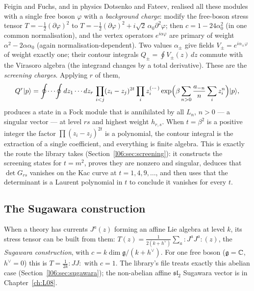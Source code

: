 Feigin and Fuchs, and in physics Dotsenko and Fateev, realised all these modules with a single free
boson $\varphi$ with a \emph{background charge}: modify the free-boson stress tensor
$T = -\frac12(\partial\varphi)^2$ to $T = -\frac12(\partial\varphi)^2 + i\sqrt2\,\alpha_0\partial^2\varphi$; then
$c = 1-24\alpha_0^2$ (in one common normalisation), and the vertex operators $e^{i\alpha\varphi}$ are
primary of weight $\alpha^2-2\alpha\alpha_0$ (again normalisation-dependent). Two values $\alpha_\pm$ give
fields $V_\pm = e^{i\alpha_\pm\varphi}$ of weight exactly one; their contour integrals
$Q_\pm = \oint V_\pm(z)\,dz$ commute with the Virasoro algebra (the integrand changes by a total
derivative). These are the \emph{screening charges}. Applying $r$ of them,
\begin{equation*}
 Q^r|p\rangle = \oint\!\cdots\!\oint dz_1\cdots dz_r\,\prod_{i<j}(z_i-z_j)^{2t}\prod_i z_i^{(\cdots)}
 \exp\Bigl(\beta\sum_{n>0}\frac{a_{-n}}{n}\sum_i z_i^n\Bigr)|p\rangle ,
\end{equation*}
produces a state in a Fock module that is annihilated by all $L_n$, $n>0$ --- a singular vector ---
at level $rs$ and highest weight $h_{r,s}$. When $t = \beta^2$ is a positive integer the factor
$\prod(z_i-z_j)^{2t}$ is a polynomial, the contour integral is the extraction of a single coefficient,
and everything is finite algebra. This is exactly the route the library takes
(Section~\ref{l06:sec:screening}): it constructs the screening states for $t = m^2$, proves they are
nonzero and singular, deduces that $\det G_{rs}$ vanishes on the Kac curve at $t = 1,4,9,\dots$, and then
uses that the determinant is a Laurent polynomial in $t$ to conclude it vanishes for every $t$.

\subsection{The Sugawara construction}

When a theory has currents $J^a(z)$ forming an affine Lie algebra at level $k$, its stress tensor can be
built from them: $T(z) = \frac{1}{2(k+h^\vee)}\sum_a{:}J^aJ^a{:}(z)$, the \emph{Sugawara construction},
with $c = k\dim\mathfrak g/(k+h^\vee)$. For one free boson ($\mathfrak g = {\mathbb{C}}$, $h^\vee = 0$) this is
$T = \frac{1}{2k}{:}JJ{:}$ with $c = 1$. The library's file  treats
exactly this abelian case (Section~\ref{l06:sec:sugawara}); the non-abelian affine $\mathfrak{sl}_2$
Sugawara vector is in Chapter~\ref{ch:L08}.

